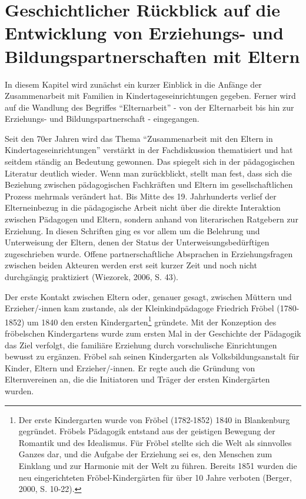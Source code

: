 \documentclass[12pt,a4paper]{article}
\begin{document}
\section{Geschichtlicher Rückblick auf die Entwicklung von Erziehungs- und Bildungspartnerschaften mit Eltern}
In diesem Kapitel wird zunächst ein kurzer Einblick in die Anfänge der Zusammenarbeit mit Familien in Kindertageseinrichtungen gegeben. Ferner wird auf die Wandlung des Begriffes "`Elternarbeit"' -  von der Elternarbeit bis hin zur Erziehungs- und Bildungspartnerschaft - eingegangen.

	 Seit den 70er Jahren wird das Thema "`Zusammenarbeit mit den Eltern in  Kindertageseinrichtungen"' ver\-stärkt in der Fachdiskussion thematisiert und hat seitdem ständig an Bedeutung gewonnen. Das spiegelt sich in der pädagogischen Literatur deutlich wieder. Wenn man zurückblickt, stellt man fest, dass sich die Beziehung zwischen pädagogischen Fachkräften und Eltern im gesellschaftlichen Prozess mehrmals verändert hat. Bis Mitte des 19. Jahrhunderts verlief der Elterneinbezug in die pädagogische Arbeit nicht über die direkte Interaktion zwischen Pädagogen und Eltern, sondern anhand von literarischen Ratgebern zur Erziehung. In diesen Schriften ging es vor allem um die Belehrung und Unterweisung der Eltern, denen der Status der Unterweisungsbedürftigen zugeschrieben wurde. Offene partnerschaftliche Absprachen in Erziehungsfragen zwischen beiden Akteuren werden erst seit kurzer Zeit und noch nicht durchgängig praktiziert (Wiezorek, 2006, S. 43).
	 
	Der erste Kontakt zwischen Eltern oder, genauer gesagt, zwischen Müttern und Erzieher/-innen kam zustande, als der Kleinkindpädagoge Friedrich Fröbel (1780-1852) um 1840 den ersten Kindergarten\footnote{Der erste Kindergarten wurde von Fröbel (1782-1852) 1840 in Blankenburg gegründet. Fröbels Pädagogik entstand aus der geistigen Bewegung der Romantik und des Idealismus. Für Fröbel stellte sich die Welt als sinnvolles Ganzes dar, und die Aufgabe der Erziehung sei es, den Menschen zum Einklang und zur Harmonie mit der Welt zu führen. Bereits 1851 wurden die neu eingerichteten Fröbel-Kindergärten für über 10 Jahre verboten (Berger, 2000, S. 10-22).} gründete. Mit der Konzeption des fröbelschen Kindergartens wurde zum ersten Mal in der Geschichte der Pädagogik das Ziel verfolgt, die familiäre Erziehung durch vorschulische Einrichtungen bewusst zu ergänzen. Fröbel sah seinen Kindergarten als Volksbildungsanstalt für Kinder, Eltern und Erzieher/-innen. Er regte auch die Gründung von Elternvereinen an, die die Initiatoren und Träger der ersten Kindergärten wurden.
	
\end{document}
